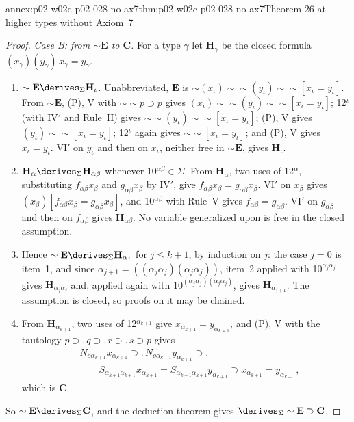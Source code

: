 \begin{annexitem}{annex:p02-w02c-p02-028-no-ax7}{thm:p02-w02c-p02-028-no-ax7}{Theorem 26 at higher types without Axiom~7}
\begin{proof}
\emph{Case B: from \(\sim\mathbf E\) to \(\mathbf C\).}  For a type
\(\gamma\) let \(\mathbf H_\gamma\) be the closed formula
\((x_\gamma)(y_\gamma)\,x_\gamma=y_\gamma\).
\begin{enumerate}
 \item \(\sim\mathbf E\derives_\Sigma\mathbf H_\iota\).  Unabbreviated,
   \(\mathbf E\) is \(\sim(x_\iota)\sim\sim(y_\iota)\sim\sim[x_\iota=y_\iota]\).
   From \(\sim\mathbf E\), (P), V with \(\sim\sim p\supset p\) gives
   \((x_\iota)\sim\sim(y_\iota)\sim\sim[x_\iota=y_\iota]\); 12\(^\iota\)
   (with IV\('\) and Rule~II) gives
   \(\sim\sim(y_\iota)\sim\sim[x_\iota=y_\iota]\); (P), V gives
   \((y_\iota)\sim\sim[x_\iota=y_\iota]\); 12\(^\iota\) again gives
   \(\sim\sim[x_\iota=y_\iota]\); and (P), V gives \(x_\iota=y_\iota\).
   VI\('\) on \(y_\iota\) and then on \(x_\iota\), neither free in
   \(\sim\mathbf E\), gives \(\mathbf H_\iota\).
 \item \(\mathbf H_\alpha\derives_\Sigma\mathbf H_{\alpha\beta}\) whenever
   10\(^{\alpha\beta}\in\Sigma\).  From \(\mathbf H_\alpha\), two uses of
   12\(^\alpha\), substituting \(f_{\alpha\beta}x_\beta\) and
   \(g_{\alpha\beta}x_\beta\) by IV\('\), give
   \(f_{\alpha\beta}x_\beta=g_{\alpha\beta}x_\beta\).  VI\('\) on
   \(x_\beta\) gives \((x_\beta)[f_{\alpha\beta}x_\beta=g_{\alpha\beta}x_\beta]\),
   and 10\(^{\alpha\beta}\) with Rule~V gives
   \(f_{\alpha\beta}=g_{\alpha\beta}\).  VI\('\) on \(g_{\alpha\beta}\) and
   then on \(f_{\alpha\beta}\) gives \(\mathbf H_{\alpha\beta}\).  No
   variable generalized upon is free in the closed assumption.
 \item Hence \(\sim\mathbf E\derives_\Sigma\mathbf H_{\alpha_{j}}\) for
   \(j\le k+1\), by induction on \(j\): the case \(j=0\) is item~1, and since
   \(\alpha_{j+1}=((\alpha_j\alpha_j)(\alpha_j\alpha_j))\), item~2 applied
   with 10\(^{\alpha_j\alpha_j}\) gives \(\mathbf H_{\alpha_j\alpha_j}\) and,
   applied again with 10\(^{(\alpha_j\alpha_j)(\alpha_j\alpha_j)}\), gives
   \(\mathbf H_{\alpha_{j+1}}\).  The assumption is closed, so proofs on it
   may be chained.
 \item From \(\mathbf H_{\alpha_{k+1}}\), two uses of 12\(^{\alpha_{k+1}}\)
   give \(x_{\alpha_{k+1}}=y_{\alpha_{k+1}}\), and (P), V with the tautology
   \(p\supset.\,q\supset.\,r\supset.\,s\supset p\) gives
   \[
   \begin{aligned}
    &N_{o\alpha_{k+1}}x_{\alpha_{k+1}}\supset.\,N_{o\alpha_{k+1}}y_{\alpha_{k+1}}\supset.\\
    &\qquad S_{\alpha_{k+1}\alpha_{k+1}}x_{\alpha_{k+1}}=S_{\alpha_{k+1}\alpha_{k+1}}y_{\alpha_{k+1}}
    \supset x_{\alpha_{k+1}}=y_{\alpha_{k+1}},
   \end{aligned}
   \]
   which is \(\mathbf C\).
\end{enumerate}
So \(\sim\mathbf E\derives_\Sigma\mathbf C\), and the deduction theorem
gives \(\derives_\Sigma\sim\mathbf E\supset\mathbf C\).


\end{proof}
\end{annexitem}
